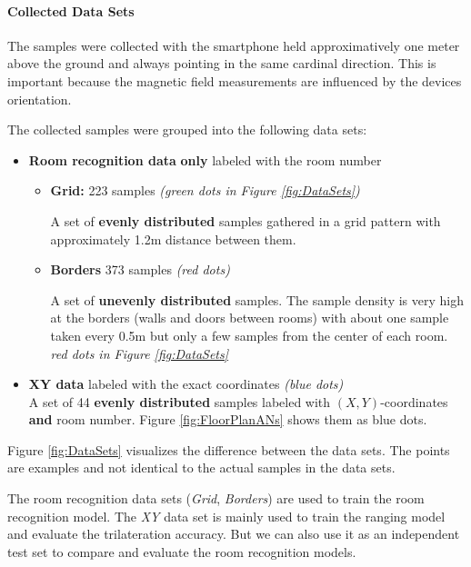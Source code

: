 \paragraph{Collected Data Sets} The samples were collected with the smartphone held approximatively one meter above the ground and always pointing in the same cardinal direction. This is important because the magnetic field measurements are influenced by the devices orientation.

The collected samples were grouped into the following data sets:

\begin{itemize}
\item \textbf{Room recognition data} \textbf{only} labeled with the room number
	\begin{itemize}
	\item \textbf{Grid:} 223 samples \textit{(green dots in Figure \ref{fig:DataSets})}

	A set of \textbf{evenly distributed} samples gathered in a grid pattern with approximately 1.2m distance between them.
	\item \textbf{Borders} 373 samples \textit{(red dots)}

	A set of \textbf{unevenly distributed} samples. The sample density is very high at the borders (walls and doors between rooms) with about one sample taken every 0.5m but only a few samples from the center of each room.\\
	\textit{red dots in Figure \ref{fig:DataSets}}
	\end{itemize}
 \item \textbf{XY data} labeled with the exact coordinates \textit{(blue dots)}\\
A set of 44 \textbf{evenly distributed} samples labeled with \((X,Y)\)-coordinates \textbf{and} room number. Figure \ref{fig:FloorPlanANs} shows them as blue dots.
\end{itemize}

Figure \ref{fig:DataSets} visualizes the difference between the data sets. The points are examples and not identical to the actual samples in the data sets.

The room recognition data sets (\emph{Grid}, \emph{Borders}) are used to train the room recognition model. The \emph{XY} data set is mainly used to train the ranging model and evaluate the trilateration accuracy. But we can also use it as an independent test set to compare and evaluate the room recognition models.

